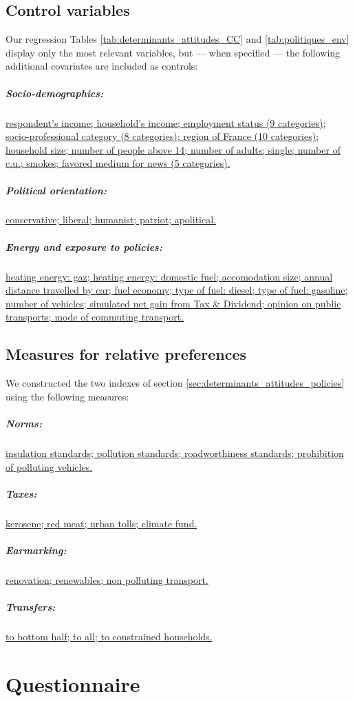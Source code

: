 \documentclass[english,5p,authoryear]{elsarticle}
\begin{document}
\begin{appendices}
\subsection{Control variables\label{app:covariates}}

Our regression Tables \ref{tab:determinants_attitudes_CC} and \ref{tab:politiques_env} display only the most relevant variables, but --- when specified --- the following additional covariates are included as controls:

\subparagraph{Socio-demographics:} \uline{respondent's income; household's income; employment status \textnormal{(9 categories)}; socio-professional category \textnormal{(8 categories)}; region of France \textnormal{(10 categories)}; household size; number of people above 14; number of adults; single; number of c.u.; smokes; favored medium for news \textnormal{(5 categories)}.}

\subparagraph{Political orientation:} \uline{conservative; liberal; humanist; patriot; apolitical.}

\subparagraph{Energy and exposure to policies:} \uline{heating energy: gaz; heating energy: domestic fuel; accomodation size; annual distance travelled by car; fuel economy; type of fuel: diesel; type of fuel: gasoline; number of vehicles; simulated net gain from Tax \& Dividend; opinion on public transports; mode of commuting transport.}

\subsection{Measures for relative preferences\label{app:measures}}

We constructed the two indexes of section \ref{sec:determinants_attitudes_policies} using the following measures:

\subparagraph{Norms:} \uline{insulation standards;  pollution standards; roadworthiness standards; prohibition of polluting vehicles.}

\subparagraph{Taxes:} \uline{kerosene; red meat; urban tolls; climate fund.}

\subparagraph{Earmarking:} \uline{renovation; renewables; non polluting transport.}

\subparagraph{Transfers:} \uline{to bottom half; to all; to constrained households.}

\section{Questionnaire\label{app:questionnaire}}


\end{appendices}
\end{document}
